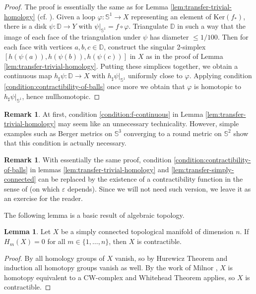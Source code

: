 \documentclass[12pt]{amsart}
\theoremstyle{definition}
\def\fnum{equation}
\newtheorem{lemma}[\fnum]{Lemma}
\newtheorem{remark}[\fnum]{Remark}
\numberwithin{equation}{section}
\newcommand{\Ker}{{\text{Ker}}}
\begin{document}
\begin{proof}
    The proof is essentially the same as for Lemma \ref{lem:transfer-trivial-homology} (cf. \cite[Theorem 2.1]{sormani-wei}). Given a loop $\varphi : \mathbb{S}^1 \to X$ representing an element of $\Ker (f_{\ast})$, there is a disk $\psi : \mathbb{D} \to Y  $ with $\psi \vert _{ \mathbb{S}^1} = f \circ \varphi$. Triangulate $\mathbb{D}$ in such a way that the image of each face of the triangulation under $\psi$ has diameter $\leq 1/100$. Then for each face with vertices $a, b, c \in \mathbb{D}$, construct the singular 2-simplex $[ h(\psi (a)) , h(\psi (b)) , h(\psi (c) )  ] $ in $X$ as in the proof of Lemma \ref{lem:transfer-trivial-homology}. Putting these simplices together, we obtain a continuous map $h_{\sharp} \psi : \mathbb{D} \to X $ with  $h_{\sharp } \psi \vert _{\mathbb{S}^1 }$ uniformly close to $\varphi$. Applying condition \eqref{condition:contractibility-of-balls} once more we obtain that $\varphi$ is homotopic to $h_{\sharp} \psi \vert _{\mathbb{S}^1}$, hence nullhomotopic.
\end{proof}

\begin{remark}
    At first, condition \eqref{condition:f-continuous} in Lemma \ref{lem:transfer-trivial-homology}  may seem like an unnecessary technicality. However, simple examples such as Berger metrics on $\mathbb{S}^3$ converging to a round metric on $\mathbb{S}^2$ show that this condition is actually necessary. 
\end{remark}



\begin{remark}
    With essentially the same proof, condition \eqref{condition:contractibility-of-balls} in lemmas \ref{lem:transfer-trivial-homology} and \ref{lem:transfer-simply-connected} can be replaced by the existence of a contractibility function in the sense of \cite{petersen} (on which $\varepsilon$ depends). Since we will not need such version, we leave it as an exercise for the reader.
\end{remark}

\color{black}

The following lemma is a basic result of algebraic topology.


\begin{lemma}\label{lem:contractible}
Let $X$ be a simply connected topological manifold of dimension $n$. If $H_m (X) = 0$ for all $m \in \{ 1, \ldots, n\} $, then $X$ is contractible.
\end{lemma}
\begin{proof}
    By \cite[Proposition 3.29]{hatcher} all homology groups of $X$ vanish, so by Hurewicz Theorem \cite[Theorem 2.1]{hutchings} and induction all homotopy groups vanish as well. By the work of Milnor \cite[Corollary 1]{milnor-cw}, $X$ is homotopy equivalent to a CW-complex and Whitehead Theorem \cite[Theorem 4.5]{hatcher} applies, so  $X$ is contractible.
\end{proof}
\end{document}
